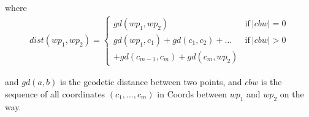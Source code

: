 where
\begin{align*}
dist(wp_1, wp_2) = \begin{cases} 
gd(wp_1, wp_2) & \text{if}\ |cbw| = 0 \\
gd(wp_1, c_1) + gd(c_1, c_2) + ... & \text{if}\ |cbw| > 0 \\
+ gd(c_{m-1}, c_m) + gd(c_m, wp_2)
\end{cases}
\end{align*}

and $gd(a, b)$ is the geodetic distance between two points, and $cbw$ is the sequence of all coordinates $(c_1,...,c_m)$ in Coords between $wp_1$ and $wp_2$ on the way.